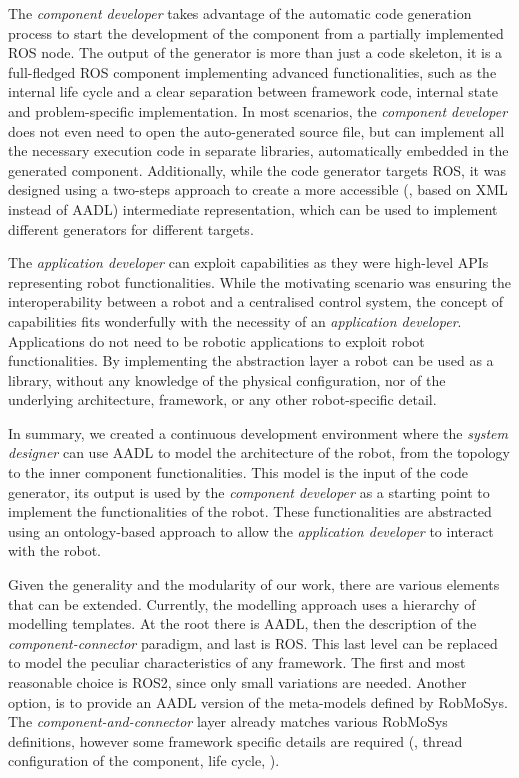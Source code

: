 The \textit{component developer} takes advantage of the automatic code generation process to start the development of the component from a partially implemented ROS node. The output of the generator is more than just a code skeleton, it is a full-fledged ROS component implementing advanced functionalities, such as the internal life cycle and a clear separation between framework code, internal state and problem-specific implementation. In most scenarios, the \textit{component developer} does not even need to open the auto-generated source file, but can implement all the necessary execution code in separate libraries, automatically embedded in the generated component. Additionally, while the code generator targets ROS, it was designed using a two-steps approach to create a more accessible (\ie, based on XML instead of AADL) intermediate representation, which can be used to implement different generators for different targets.

The \textit{application developer} can exploit capabilities as they were high-level APIs representing robot functionalities. While the motivating scenario was ensuring the interoperability between a robot and a centralised control system, the concept of capabilities fits wonderfully with the necessity of an \textit{application developer}. Applications do not need to be robotic applications to exploit robot functionalities. By implementing the abstraction layer a robot can be used as a library, without any knowledge of the physical configuration, nor of the underlying architecture, framework, or any other robot-specific detail. 

In summary, we created a continuous development environment where the \textit{system designer} can use AADL to model the architecture of the robot, from the topology to the inner component functionalities. This model is the input of the code generator, its output is used by the \textit{component developer} as a starting point to implement the functionalities of the robot. These functionalities are abstracted using an ontology-based approach to allow the \textit{application developer} to interact with the robot.

Given the generality and the modularity of our work, there are various elements that can be extended. Currently, the modelling approach uses a hierarchy of modelling templates. At the root there is AADL, then the description of the \textit{component-connector} paradigm, and last is ROS. This last level can be replaced to model the peculiar characteristics of any framework. The first and most reasonable choice is ROS2, since only small variations are needed. Another option, is to provide an AADL version of the meta-models defined by RobMoSys. The \textit{component-and-connector} layer already matches various RobMoSys definitions, however some framework specific details are required (\eg, thread configuration of the component, life cycle, \etc).

